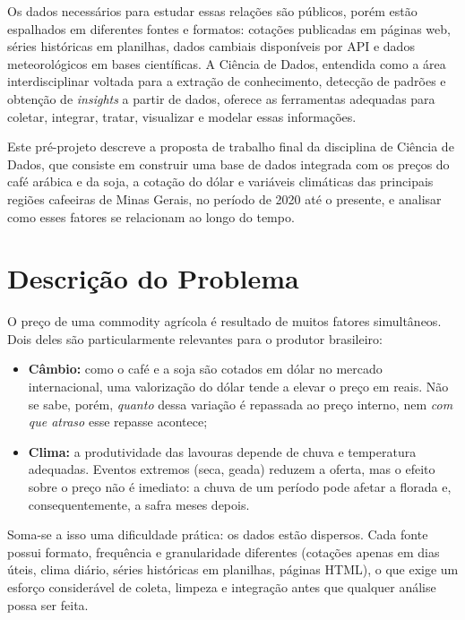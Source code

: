 \documentclass{article}
\begin{document}
Os dados necessários para estudar essas relações são públicos, porém estão espalhados em diferentes fontes
e formatos: cotações publicadas em páginas web, séries históricas em planilhas, dados cambiais disponíveis
por API e dados meteorológicos em bases científicas. A Ciência de Dados, entendida como a área
interdisciplinar voltada para a extração de conhecimento, detecção de padrões e obtenção de
\textit{insights} a partir de dados, oferece as ferramentas adequadas para coletar, integrar, tratar,
visualizar e modelar essas informações.

Este pré-projeto descreve a proposta de trabalho final da disciplina de Ciência de Dados, que consiste em
construir uma base de dados integrada com os preços do café arábica e da soja, a cotação do dólar e
variáveis climáticas das principais regiões cafeeiras de Minas Gerais, no período de 2020 até o presente,
e analisar como esses fatores se relacionam ao longo do tempo.


\section{Descrição do Problema}

O preço de uma commodity agrícola é resultado de muitos fatores simultâneos. Dois deles são
particularmente relevantes para o produtor brasileiro:

\begin{itemize}
      \item \textbf{Câmbio:} como o café e a soja são cotados em dólar no mercado internacional, uma
            valorização do dólar tende a elevar o preço em reais. Não se sabe, porém, \textit{quanto} dessa
            variação é repassada ao preço interno, nem \textit{com que atraso} esse repasse acontece;
      \item \textbf{Clima:} a produtividade das lavouras depende de chuva e temperatura adequadas. Eventos
            extremos (seca, geada) reduzem a oferta, mas o efeito sobre o preço não é imediato: a chuva de
            um período pode afetar a florada e, consequentemente, a safra meses depois.
\end{itemize}

Soma-se a isso uma dificuldade prática: os dados estão dispersos. Cada fonte possui formato, frequência e
granularidade diferentes (cotações apenas em dias úteis, clima diário, séries históricas em planilhas,
páginas HTML), o que exige um esforço considerável de coleta, limpeza e integração antes que qualquer
análise possa ser feita.
\end{document}
